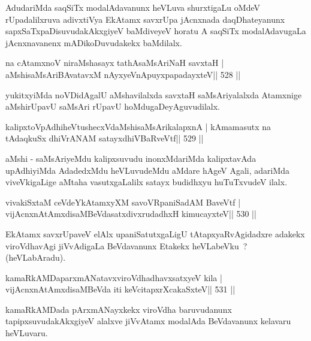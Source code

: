 \begin{artha}
AdudariMda saqSiTx modalAdavanunx heVLuva shurxtigaLu oMdeV rUpadalilxruva adivxtiVya EkAtamx savxrUpa jAcnxnada daqDhateyanunx sapxSaTxpaDisuvudakAkxgiyeV baMdiveyeV horatu A saqSiTx modalAdavugaLa jAcnxnavanenx mADikoDuvudakekx baMdilalx.
\end{artha}


\begin{shl}
na cA\s\s tamxnoV niraMshasayx tathA\s saMsAriNaH savxtaH |
aMshisaMsAriBAvatavxM nAyxyeVnApuyxpapadayxteV\hfill || 528 ||
\end{shl}

\begin{artha}
yukitxyiMda noVDidAgalU aMshavilalxda savxtaH saMsAriyalalxda Atamxnige aMshirUpavU saMsAri rUpavU hoMdugaDeyAguvudilalx.
\end{artha}

\begin{shl}
kalipxtoVpAdhiheVtushecxVdaMshisaMsArikalapxnA |
kAmamasutx na tAdaqkuSx dhiVrANAM satayxdhiVBaRveVtf\hfill || 529 ||
\end{shl}

\begin{artha}
aMshi - saMsAriyeMdu kalipxsuvudu inonxMdariMda kalipxtavAda upAdhiyiMda AdadedxMdu heVLuvudeMdu aMdare hAgeV Agali, adariMda viveVkigaLige aMtaha vasutxgaLalilx satayx budidhxyu huTuTxvudeV ilalx.
\end{artha}

\begin{shl}
vivakiSxtaM ceVdeYkAtamxyXM savoVRpaniSadAM BaveVtf |
vijAcnxnAtAmxdisaMBeVdasatxdivxrudadhxH kimucayxteV\hfill || 530 ||
\end{shl}

\begin{artha}
EkAtamx savxrUpaveV elAlx upaniSatutxgaLigU tAtapxyaRvAgidadxre adakekx viroVdhavAgi jiVvAdigaLa BeVdavanunx Etakekx heVLabeVku~? (heVLabAradu).
\end{artha}


\begin{shl}
kamaRkAMDaparxmANatavxviroVdhadhavxsatxyeV kila |
vijAcnxnAtAmxdisaMBeVda iti keVcitapxrXcakaSxteV\hfill || 531 ||
\end{shl}

\begin{artha}
kamaRkAMDada pArxmANayxkekx viroVdha baruvudanunx tapipxsuvudakAkxgiyeV alalxve jiVvAtamx modalAda BeVdavanunx kelavaru heVLuvaru.
\end{artha}

